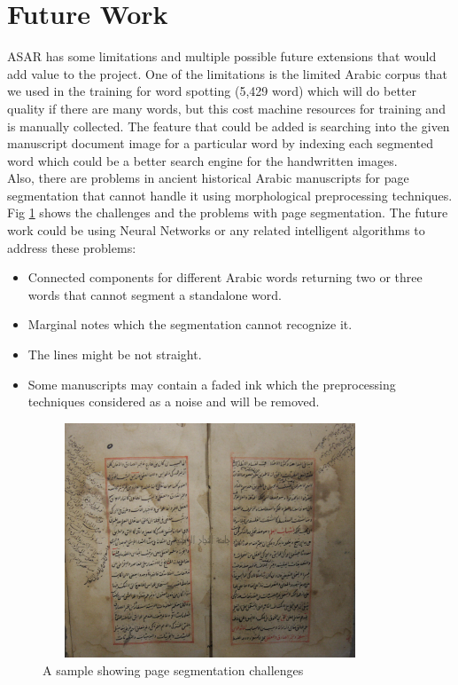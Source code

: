 \section{Future Work}
ASAR has some limitations and multiple possible future extensions that would add value to the project. One of the limitations is the limited Arabic corpus that we used in the training for word spotting (5,429 word) which will do better quality if there are many words, but this cost machine resources for training and is manually collected. The feature that could be added is searching into the given manuscript document image for a particular word by indexing each segmented word which could be a better search engine for the handwritten images. \\

Also, there are problems in ancient historical Arabic manuscripts for page segmentation that cannot handle it using morphological preprocessing techniques. Fig \ref{fig:page-chanllenges} shows the challenges and the problems with page segmentation. The future work could be using Neural Networks or any related intelligent algorithms to address these problems:

\begin{itemize}[itemsep=1pt, topsep=5pt]
    \item Connected components for different Arabic words returning two or three words that cannot segment a standalone word.
    \item Marginal notes which the segmentation cannot recognize it.
    \item The lines might be not straight. 
    \item Some manuscripts may contain a faded ink which the preprocessing techniques considered as a noise and will be removed.
\end{itemize}

\begin{figure}[!htb]
    \centering
    \includegraphics[width=10cm,height=7cm]{images/page-seg-challenges.png}
    \caption{A sample showing page segmentation challenges}
    \label{fig:page-chanllenges}
\end{figure}

\newpage

\printbibliography
